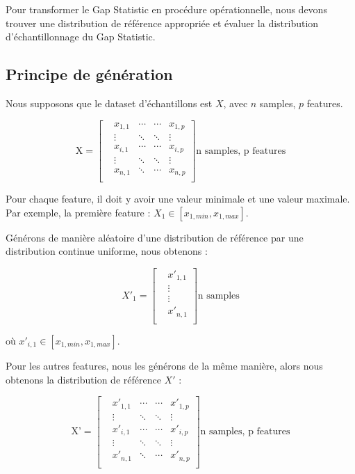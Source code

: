 Pour transformer le Gap Statistic en procédure opérationnelle, nous devons trouver une distribution de référence appropriée et évaluer la distribution d'échantillonnage du Gap Statistic.

\subsection{Principe de génération}

Nous supposons que le dataset d'échantillons est $X$, avec $n$ samples, $p$ features.

$$
\text{X} = 
\begin{bmatrix}
  & x_{1,1} & \cdots & \cdots & x_{1,p} \\
  & \vdots & \ddots &  \ddots &\vdots \\
  & x_{i,1} & \cdots  & \cdots & x_{i,p} \\
  & \vdots & \ddots  & \ddots & \vdots \\
  & x_{n,1} & \ddots & \cdots & x_{n,p} \\
\end{bmatrix}
\text{n samples, p features}
$$

Pour chaque feature, il doit y avoir une valeur minimale et une valeur maximale. Par exemple, la première feature : $X_1 \in [x_{1,min},x_{1,max}]$.

Générons de manière aléatoire d'une distribution de référence par une distribution continue uniforme, nous obtenons :

$$
\text{$X'_1$} = 
\begin{bmatrix}
  & x'_{1,1} \\
  & \vdots  \\
  & \vdots \\
  & x'_{n,1} \\
\end{bmatrix}
\text{n samples}
$$ 

où $x'_{i,1} \in [x_{1,min},x_{1,max}]$.

Pour les autres features, nous les générons de la même manière, alors nous obtenons la distribution de référence $X'$ :

$$
\text{X'} = 
\begin{bmatrix}
  & x'_{1,1} & \cdots & \cdots & x'_{1,p} \\
  & \vdots & \ddots &  \ddots &\vdots \\
  & x'_{i,1} & \cdots  & \cdots & x'_{i,p} \\
  & \vdots & \ddots  & \ddots & \vdots \\
  & x'_{n,1} & \ddots & \cdots & x'_{n,p} \\
\end{bmatrix}
\text{n samples, p features}
$$

